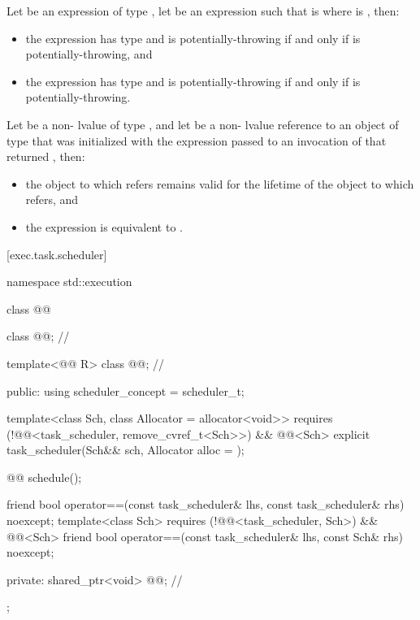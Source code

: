 \pnum
Let  be an expression of type ,
let  be an expression such that
 is 
where  is ,
then:
\begin{itemize}
\item the expression  has
type 
and is potentially-throwing if and only if
 is potentially-throwing, and
\item the expression
 has
type\brk{}  and is potentially-throwing
if and only if  is potentially-throwing.
\end{itemize}

\pnum
Let  be a non- lvalue of type
, and let  be
a non- lvalue reference to an object of type  that
was initialized with the expression  passed to an
invocation of  that returned , then:
\begin{itemize}
\item the object to which  refers remains valid for
the lifetime of the object to which  refers, and
\item the expression  is equivalent to
.
\end{itemize}

[exec.task.scheduler]{}

\begin{codeblock}
namespace std::execution {
  class @@ {
    class @@;                    // \expos

    template<@@ R>
      class @@;                      // \expos

  public:
    using scheduler_concept = scheduler_t;

    template<class Sch, class Allocator = allocator<void>>
      requires (!@@<task_scheduler, remove_cvref_t<Sch>>)
        && @@<Sch>
    explicit task_scheduler(Sch&& sch, Allocator alloc = {});

    @@ schedule();

    friend bool operator==(const task_scheduler& lhs, const task_scheduler& rhs)
        noexcept;
    template<class Sch>
      requires (!@@<task_scheduler, Sch>)
      && @@<Sch>
    friend bool operator==(const task_scheduler& lhs, const Sch& rhs) noexcept;

  private:
    shared_ptr<void> @@; // \expos
  };
}
\end{codeblock}

